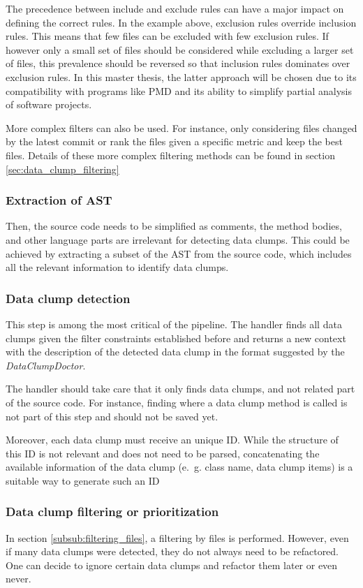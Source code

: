 The precedence between include and exclude rules can have a major impact on defining the correct rules. In the example above, exclusion rules override inclusion rules.  This means that few files can be excluded with few exclusion rules. If however only a small set of files should be considered while excluding a larger set of files, this prevalence should be reversed so that inclusion rules dominates over exclusion rules. In this master thesis, the latter approach will be chosen due to its  compatibility with programs like PMD and its ability to simplify partial analysis of software projects. 

More complex filters can also be used. For instance, only considering files changed by the latest commit or rank the files given a specific metric and keep the best files. Details of these more complex filtering methods can be found in section \ref{sec:data_clump_filtering}
\subsubsection{Extraction of AST}
Then,  the source code needs to be simplified as comments, the method bodies, and other language parts are irrelevant for detecting data clumps. This could be achieved by extracting a subset of the \ac{AST} from the source code, which includes all the relevant information to identify data clumps.


\subsubsection{Data clump detection}
This step is among the most critical of the pipeline. 
The handler finds all data clumps given the filter constraints established before and returns a new context with the description of the detected data clump in the format suggested by the \textit{DataClumpDoctor}. 

The handler should take care that it only finds data clumps, and not related part of the source code. For instance, finding where a data clump method is called is not part of this step and should not be saved yet. 

Moreover, each data clump must receive an unique ID. While the structure of this ID is not relevant and does not need to be parsed, concatenating the available information of the data clump (e.~g. class name, data clump items) is a suitable way to generate such an ID

\subsubsection{Data clump filtering or prioritization} \label{subsub:filtering_data_clumps}
In section \ref{subsub:filtering_files}, a filtering by files is performed. However, even if many data clumps were detected, they do not always need to be refactored. One can decide to ignore certain data clumps and refactor them later or even never. 

